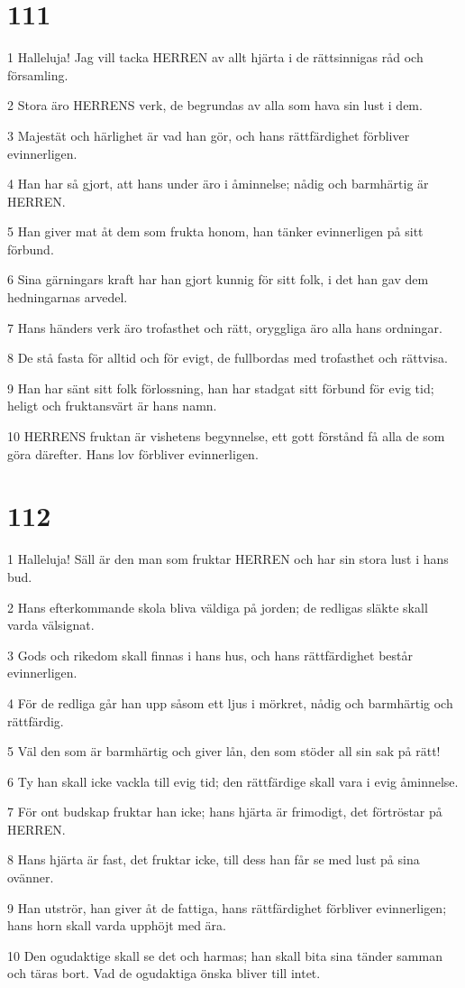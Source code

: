 \chapter{111}

\par 1 Halleluja! Jag vill tacka HERREN av allt hjärta i de rättsinnigas råd och församling.
\par 2 Stora äro HERRENS verk, de begrundas av alla som hava sin lust i dem.
\par 3 Majestät och härlighet är vad han gör, och hans rättfärdighet förbliver evinnerligen.
\par 4 Han har så gjort, att hans under äro i åminnelse; nådig och barmhärtig är HERREN.
\par 5 Han giver mat åt dem som frukta honom, han tänker evinnerligen på sitt förbund.
\par 6 Sina gärningars kraft har han gjort kunnig för sitt folk, i det han gav dem hedningarnas arvedel.
\par 7 Hans händers verk äro trofasthet och rätt, oryggliga äro alla hans ordningar.
\par 8 De stå fasta för alltid och för evigt, de fullbordas med trofasthet och rättvisa.
\par 9 Han har sänt sitt folk förlossning, han har stadgat sitt förbund för evig tid; heligt och fruktansvärt är hans namn.
\par 10 HERRENS fruktan är vishetens begynnelse, ett gott förstånd få alla de som göra därefter. Hans lov förbliver evinnerligen.

\chapter{112}

\par 1 Halleluja! Säll är den man som fruktar HERREN och har sin stora lust i hans bud.
\par 2 Hans efterkommande skola bliva väldiga på jorden; de redligas släkte skall varda välsignat.
\par 3 Gods och rikedom skall finnas i hans hus, och hans rättfärdighet består evinnerligen.
\par 4 För de redliga går han upp såsom ett ljus i mörkret, nådig och barmhärtig och rättfärdig.
\par 5 Väl den som är barmhärtig och giver lån, den som stöder all sin sak på rätt!
\par 6 Ty han skall icke vackla till evig tid; den rättfärdige skall vara i evig åminnelse.
\par 7 För ont budskap fruktar han icke; hans hjärta är frimodigt, det förtröstar på HERREN.
\par 8 Hans hjärta är fast, det fruktar icke, till dess han får se med lust på sina ovänner.
\par 9 Han utströr, han giver åt de fattiga, hans rättfärdighet förbliver evinnerligen; hans horn skall varda upphöjt med ära.
\par 10 Den ogudaktige skall se det och harmas; han skall bita sina tänder samman och täras bort. Vad de ogudaktiga önska bliver till intet.

